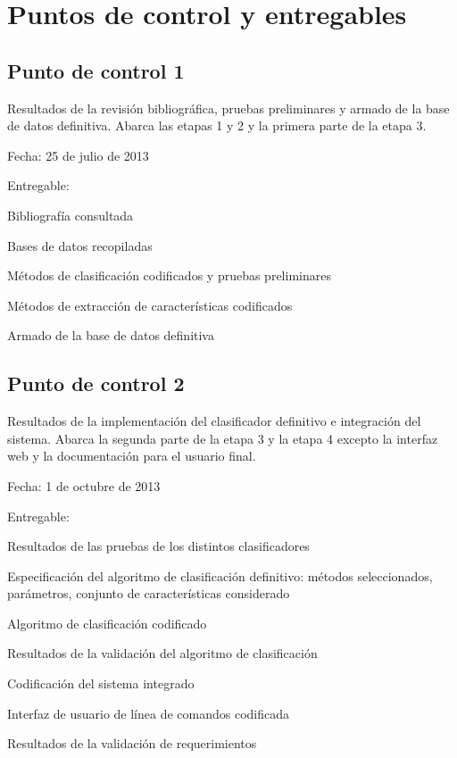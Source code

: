 \documentclass[12pt,bibliography=openstyle,DIV=12,parskip=full-]{scrartcl}
\begin{document}
\section{Puntos de control y entregables}
\subsection{Punto de control 1}
Resultados de la revisión bibliográfica, pruebas preliminares y armado
de la base de datos definitiva.  Abarca las etapas 1 y 2 y la primera
parte de la etapa 3.
\begin{description*}
  \item[Fecha:] 25 de julio de 2013
  \item[Entregable:]
  \item
    \begin{minipage}{\textwidth}
      \medskip
      \begin{itemize*}
      \item Bibliografía consultada
      \item Bases de datos recopiladas
      \item Métodos de clasificación codificados y pruebas preliminares
      \item Métodos de extracción de características codificados
      \item Armado de la base de datos definitiva
      \end{itemize*}
    \end{minipage}
\end{description*}
\newpage
\subsection{Punto de control 2}
Resultados de la implementación del clasificador definitivo e
integración del sistema. Abarca la segunda parte de la etapa 3 y la
etapa 4 excepto la interfaz web y la documentación para el usuario
final.
\begin{description*}
  \item[Fecha:] 1 de octubre de 2013
  \item[Entregable:]
  \item
    \begin{minipage}{\textwidth}
      \medskip
      \begin{itemize*}
      \item Resultados de las pruebas de los distintos clasificadores
      \item Especificación del algoritmo de clasificación definitivo:
        métodos seleccionados, parámetros, conjunto de características
        considerado
      \item Algoritmo de clasificación codificado
      \item Resultados de la validación del algoritmo de clasificación
      \item Codificación del sistema integrado
      \item Interfaz de usuario de línea de comandos codificada
      \item Resultados de la validación de requerimientos
      \end{itemize*}
    \end{minipage}
\end{description*}
\end{document}
